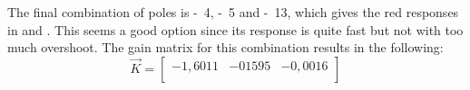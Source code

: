 The final combination of poles is \si{-4}, \si{-5} and \si{-13}, which gives the red responses in  and . This seems a good option since its response is quite fast but not with too much overshoot. The gain matrix for this combination results in the following:
%
\begin{equation}  \label{controllerSS}
	\vec{K} = 
	\begin{bmatrix}
		-1,6011 & -01595 & -0,0016 \\
	\end{bmatrix}
\end{equation}
%